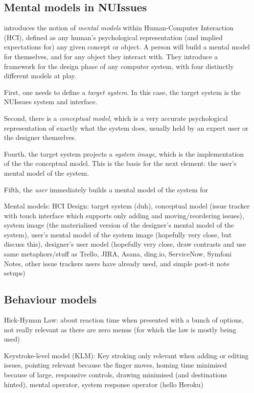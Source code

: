\subsection{Mental models in NUIssues}

\textcite{wilson-rutherford:mental-models-theory-and-application-in-human-factors:1989} introduces the notion of \textit{mental models} within Human-Computer Interaction (HCI), defined as any human's psychological representation (and implied expectations for) any given concept or object. A person will build a mental model for themselves, and for any object they interact with. They introduce a framework for the design phase of any computer system, with four distinctly different models at play.

First, one needs to define a \textit{target system}. In this case, the target system is the NUIssues system and interface.

Second, there is a \textit{conceptual model}, which is a very accurate psychological representation of exactly what the system does, usually held by an expert user or the designer themselves.

Fourth, the target system projects a \textit{system image}, which is the implementation of the the conceptual model. This is the basis for the next element: the user's mental model of the system.

Fifth, the \textit{user} immediately builds a mental model of the system for 

Mental models: HCI Design: target system (duh), conceptual model (issue tracker with touch interface which supports only adding and moving/reordering issues), system image (the materialised version of the designer's mental model of the system), user's mental model of the system image (hopefully very close, but discuss this), designer's user model (hopefully very close, draw contrasts and use same metaphors/stuff as Trello, JIRA, Asana, ding.io, ServiceNow, Symfoni Notes, other issue trackers users have already used, and simple post-it note setups)

\subsection{Behaviour models}

Hick-Hyman Law: about reaction time when presented with a bunch of options, not really relevant as there are zero menus (for which the law is mostly being used)

Keystroke-level model (KLM): Key stroking only relevant when adding or editing issues, pointing relevant because the finger moves, homing time minimised because of large, responsive controls, drawing minimised (and destinations hinted), mental operator, system response operator (hello Heroku) %

